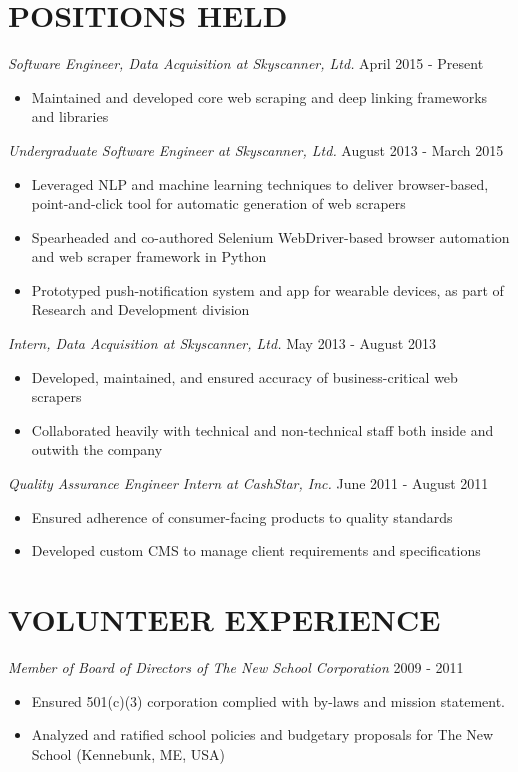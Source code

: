 \documentclass[line, margin]{res}
\begin{document}
\begin{resume}
\section{POSITIONS HELD}
\textit{Software Engineer, Data Acquisition at Skyscanner, Ltd.} \hfill April 2015 - Present
\begin{itemize}[leftmargin=10pt]
\item Maintained and developed core web scraping and deep linking frameworks and libraries
\end{itemize}
\textit{Undergraduate Software Engineer at Skyscanner, Ltd.} \hfill August 2013 - March 2015 
\begin{itemize}[leftmargin=10pt]
\item Leveraged NLP and machine learning techniques to deliver browser-based, point-and-click tool for automatic generation of web scrapers
\item Spearheaded and co-authored Selenium WebDriver-based browser automation and web scraper framework in Python
\item Prototyped push-notification system and app for wearable devices, as part of Research and Development division
\end{itemize}
\textit{Intern, Data Acquisition at Skyscanner, Ltd.} \hfill May 2013 - August 2013
\begin{itemize}[leftmargin=10pt]
\item Developed, maintained, and ensured accuracy of business-critical web scrapers
\item Collaborated heavily with technical and non-technical staff both inside and outwith the company
\end{itemize}
\textit{Quality Assurance Engineer Intern at CashStar, Inc.} \hfill June 2011 - August 2011
\begin{itemize}[leftmargin=10pt]
\item Ensured adherence of consumer-facing products to quality standards
\item Developed custom CMS to manage client requirements and specifications
\end{itemize}

\section{VOLUNTEER EXPERIENCE}
\textit{Member of Board of Directors of The New School Corporation} \hfill 2009 - 2011
\begin{itemize}[leftmargin=10pt]
\item Ensured 501(c)(3) corporation complied with by-laws and mission statement.
\item Analyzed and ratified school policies and budgetary proposals for The New School (Kennebunk, ME, USA)
\end{itemize}


\end{resume}
\end{document}
